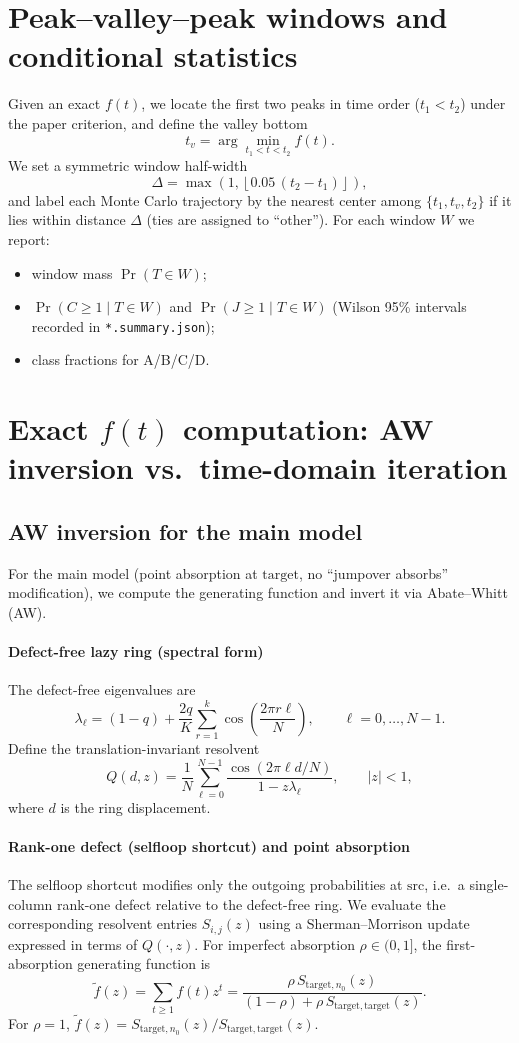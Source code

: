 \documentclass[11pt]{article}
\begin{document}
\section{Peak--valley--peak windows and conditional statistics}
Given an exact $f(t)$, we locate the first two peaks in time order ($t_1<t_2$) under the paper criterion, and define the valley bottom
\[
t_v=\arg\min_{t_1<t<t_2} f(t).
\]
We set a symmetric window half-width
\[
\Delta=\max\left(1,\left\lfloor 0.05\,(t_2-t_1)\right\rfloor\right),
\]
and label each Monte Carlo trajectory by the nearest center among $\{t_1,t_v,t_2\}$ if it lies within distance $\Delta$ (ties are assigned to ``other'').
For each window $W$ we report:
\begin{itemize}
  \item window mass $\Pr(T\in W)$;
  \item $\Pr(C\ge 1\mid T\in W)$ and $\Pr(J\ge 1\mid T\in W)$ (Wilson 95\% intervals recorded in \texttt{*.summary.json});
  \item class fractions for A/B/C/D.
\end{itemize}

\section{Exact $f(t)$ computation: AW inversion vs.\ time-domain iteration}
\subsection{AW inversion for the main model}
For the main model (point absorption at $\mathrm{target}$, no ``jumpover absorbs'' modification), we compute the generating function and invert it via Abate--Whitt (AW).

\paragraph{Defect-free lazy ring (spectral form)}
The defect-free eigenvalues are
\[
\lambda_\ell=(1-q)+\frac{2q}{K}\sum_{r=1}^{k}\cos\!\left(\frac{2\pi r\ell}{N}\right),\qquad \ell=0,\dots,N-1.
\]
Define the translation-invariant resolvent
\[
Q(d,z)=\frac{1}{N}\sum_{\ell=0}^{N-1}\frac{\cos(2\pi \ell d/N)}{1-z\lambda_\ell},\qquad |z|<1,
\]
where $d$ is the ring displacement.

\paragraph{Rank-one defect (selfloop shortcut) and point absorption}
The selfloop shortcut modifies only the outgoing probabilities at $\mathrm{src}$, i.e.\ a single-column rank-one defect relative to the defect-free ring.
We evaluate the corresponding resolvent entries $S_{i,j}(z)$ using a Sherman--Morrison update expressed in terms of $Q(\cdot,z)$.
For imperfect absorption $\rho\in(0,1]$, the first-absorption generating function is
\[
\tilde f(z)=\sum_{t\ge 1} f(t)z^t=\frac{\rho\,S_{\mathrm{target},n_0}(z)}{(1-\rho)+\rho\,S_{\mathrm{target},\mathrm{target}}(z)}.
\]
For $\rho=1$, $\tilde f(z)=S_{\mathrm{target},n_0}(z)/S_{\mathrm{target},\mathrm{target}}(z)$.
\end{document}
